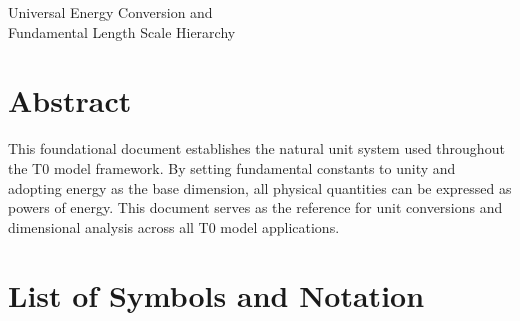 Universal Energy Conversion and\\
	Fundamental Length Scale Hierarchy

\section*{Abstract}
		This foundational document establishes the natural unit system used throughout the T0 model framework. By setting fundamental constants to unity and adopting energy as the base dimension, all physical quantities can be expressed as powers of energy. This document serves as the reference for unit conversions and dimensional analysis across all T0 model applications.

	
	
	\section{List of Symbols and Notation}
	
